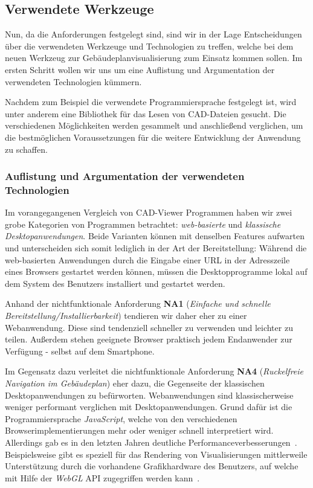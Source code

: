 \subsection{Verwendete Werkzeuge}
\label{subsec:used-tools}

Nun, da die Anforderungen festgelegt sind, sind wir in der Lage Entscheidungen über die verwendeten Werkzeuge und Technologien zu treffen, welche bei dem neuen Werkzeug zur Gebäudeplanvisualisierung zum Einsatz kommen sollen.
Im ersten Schritt wollen wir uns um eine Auflistung und Argumentation der verwendeten Technologien kümmern.

Nachdem zum Beispiel die verwendete Programmiersprache festgelegt ist, wird unter anderem eine Bibliothek für das Lesen von CAD-Dateien gesucht.
Die verschiedenen Möglichkeiten werden gesammelt und anschließend verglichen, um die bestmöglichen Voraussetzungen für die weitere Entwicklung der Anwendung zu schaffen.

\subsubsection{Auflistung und Argumentation der verwendeten Technologien}
\label{subsec:collection-tools}

Im vorangegangenen Vergleich von CAD-Viewer Programmen haben wir zwei grobe Kategorien von Programmen betrachtet: \textit{web-basierte} und \textit{klassische Desktopanwendungen}.
Beide Varianten können mit denselben Features aufwarten und unterscheiden sich somit lediglich in der Art der Bereitstellung:
Während die web-basierten Anwendungen durch die Eingabe einer URL in der Adresszeile eines Browsers gestartet werden können, müssen die Desktopprogramme lokal auf dem System des Benutzers installiert und gestartet werden.

Anhand der nichtfunktionale Anforderung \textbf{NA1} (\textit{Einfache und schnelle Bereitstellung/Installierbarkeit}) tendieren wir daher eher zu einer Webanwendung.
Diese sind tendenziell schneller zu verwenden und leichter zu teilen.
Außerdem stehen geeignete Browser praktisch jedem Endanwender zur Verfügung - selbst auf dem Smartphone.

Im Gegensatz dazu verleitet die nichtfunktionale Anforderung \textbf{NA4} (\textit{Ruckelfreie Navigation im Gebäudeplan}) eher dazu, die Gegenseite der klassischen Desktopanwendungen zu befürworten.
Webanwendungen sind klassischerweise weniger performant verglichen mit Desktopanwendungen.
Grund dafür ist die Programmiersprache \textit{JavaScript}, welche von den verschiedenen Browserimplementierungen mehr oder weniger schnell interpretiert wird.
Allerdings gab es in den letzten Jahren deutliche Performanceverbesserungen~\cite{WebAppMolecular}.
Beispielsweise gibt es speziell für das Rendering von Visualisierungen mittlerweile Unterstützung durch die vorhandene Grafikhardware des Benutzers, auf welche mit Hilfe der \textit{WebGL} API zugegriffen werden kann~\cite{WebAppMolecular}.

